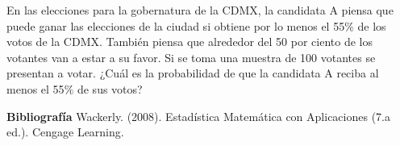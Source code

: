 \documentclass{../oxmathproblems}
\begin{document}
\begin{questions}
\miquestion En las elecciones para la gobernatura de la CDMX, la candidata A piensa que puede ganar las elecciones de la ciudad si obtiene por lo menos el 55$\%$ de los votos de la CDMX. También piensa que alrededor del 50 por ciento de los votantes van a estar a su favor. Si se toma una muestra de 100 votantes se presentan a votar. ¿Cuál es la probabilidad de que la candidata A reciba al menos el 55$\%$ de sus votos?










\textbf{Bibliografía}
Wackerly. (2008). Estadística Matemática con Aplicaciones (7.a ed.). Cengage Learning.


\end{questions}
\end{document}
